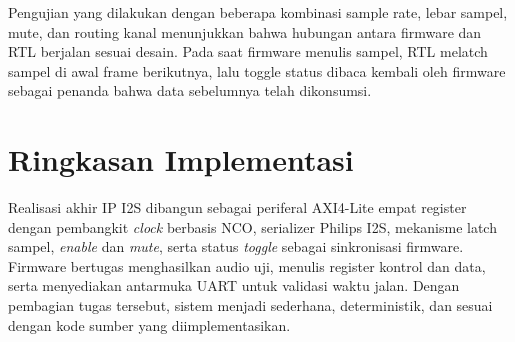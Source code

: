 Pengujian yang dilakukan dengan beberapa kombinasi sample rate, lebar sampel, mute, dan routing kanal menunjukkan bahwa hubungan antara firmware dan RTL berjalan sesuai desain. Pada saat firmware menulis sampel, RTL melatch sampel di awal frame berikutnya, lalu toggle status dibaca kembali oleh firmware sebagai penanda bahwa data sebelumnya telah dikonsumsi.

\section{Ringkasan Implementasi}

Realisasi akhir IP I2S dibangun sebagai periferal AXI4-Lite empat register dengan pembangkit \textit{clock} berbasis NCO, serializer Philips I2S, mekanisme latch sampel, \textit{enable} dan \textit{mute}, serta status \textit{toggle} sebagai sinkronisasi firmware. Firmware bertugas menghasilkan audio uji, menulis register kontrol dan data, serta menyediakan antarmuka UART untuk validasi waktu jalan. Dengan pembagian tugas tersebut, sistem menjadi sederhana, deterministik, dan sesuai dengan kode sumber yang diimplementasikan.
